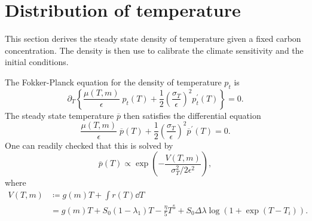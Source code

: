 \documentclass[../../main.tex]{subfiles}
\begin{document}
\section{Distribution of temperature} \label{appendix:density}

This section derives the steady state density of temperature given a fixed carbon concentration. The density is then use to calibrate the climate sensitivity and the initial conditions.

The Fokker-Planck equation for the density of temperature $p_t$ is \begin{equation}
    \partial_T \left\{ \frac{\mu(T, m)}{\epsilon} \; p_t(T) + \frac{1}{2} \left(\frac{\sigma_T}{\epsilon}\right)^2 p_t^\prime(T) \right\} = 0.
\end{equation} The steady state temperature $\overline{p}$ then satisfies the differential equation \begin{equation}
    \frac{\mu(T, m)}{\epsilon} \; \overline{p}(T) + \frac{1}{2} \left(\frac{\sigma_T}{\epsilon}\right)^2 \overline{p}^\prime(T) = 0.
\end{equation} One can readily checked that this is solved by  \begin{equation}
    \overline{p}(T) \propto \exp\left( -\frac{V(T, m)}{\sigma^2_T / 2\epsilon^2} \right), 
\end{equation} where \begin{equation}
    \begin{split}
        V(T, m) &\coloneqq  g(m) T + \int r(T) \dd{T} \\
        &= g(m) T + S_0 (1 - \lambda_1) T - \frac{\eta}{5} T^5 + S_0 \Delta\lambda \log(1 + \exp(T - T_i)).
    \end{split}
\end{equation}
\end{document}
